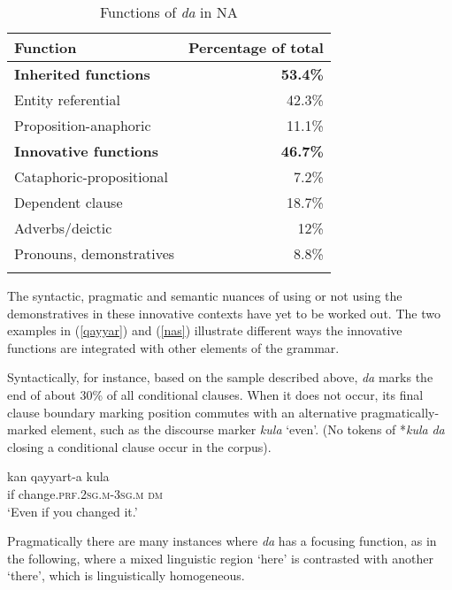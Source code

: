 \documentclass[output=paper]{langsci/langscibook}
\begin{document}
\begin{table}\begin{tabularx}{.67\textwidth}{lr}
\lsptoprule
Function & Percentage of total\\
\midrule
\bfseries Inherited functions & \bfseries 53.4\%\\
        \hspace{5mm}Entity referential  & 42.3\%\\
        \hspace{5mm}Proposition-anaphoric  & 11.1\%\\
\addlinespace        
\bfseries Innovative functions & \bfseries 46.7\%\\
        \hspace{5mm}Cataphoric-propositional & 7.2\%\\
        \hspace{5mm}Dependent clause & 18.7\%\\
        \hspace{5mm}Adverbs/deictic & 12\%\\
        \hspace{5mm}Pronouns, demonstratives & 8.8\%\\
\lspbottomrule
\end{tabularx}
\caption{
\label{bkm:Ref520915528}Functions of \textit{da} in NA
}
\label{tab:funct}
\end{table}


The syntactic, pragmatic and semantic nuances of using or not using the dem\-onstratives in these innovative contexts have yet to be worked out. The two examples in (\ref{qayyar}) and (\ref{nas}) illustrate different ways the innovative functions are integrated with other elements of the grammar.

Syntactically, for instance, based on the sample described above, \textit{da} marks the end of about 30\% of all conditional clauses. When it does not occur, its final clause boundary marking position commutes with an alternative pragmatically-marked element, such as the discourse marker \textit{kula} ‘even’. (No tokens of *\textit{kula} \textit{da} closing a conditional clause occur in the corpus).

\ea\label{qayyar} 
\gll kan qayyart-a kula\\
     if change.\textsc{prf.2sg.m-3sg.m} \textsc{dm}\\
\glt ‘Even if you changed it.’
\z

Pragmatically there are many instances where \textit{da} has a focusing function, as in the following, where a mixed linguistic region ‘here’ is contrasted with another ‘there’, which is linguistically homogeneous.
\end{document}
